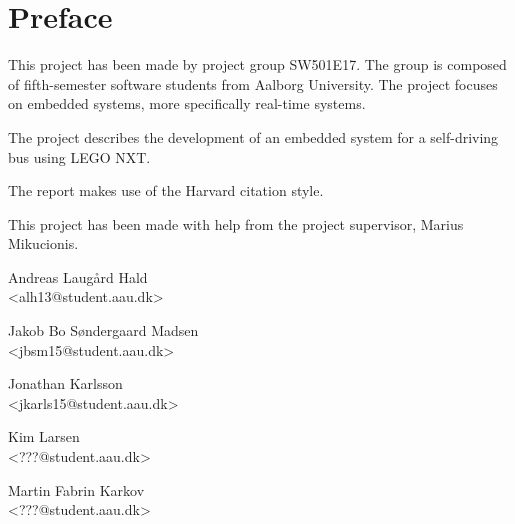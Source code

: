 \chapter*{Preface}

This project has been made by project group SW501E17. The group is composed of fifth-semester software students from Aalborg University. The project focuses on embedded systems, more specifically real-time systems. 

The project describes the development of an embedded system for a self-driving bus using LEGO NXT.

The report makes use of the Harvard citation style.

This project has been made with help from the project supervisor, Marius Mikucionis.




\vspace{\baselineskip}\hfill
\vfill\noindent
\vspace{3\baselineskip}
\begin{minipage}[b]{0.45\textwidth}
 \centering
  Andreas Laugård Hald\\
 {\footnotesize <alh13@student.aau.dk>}
\end{minipage}
\hfill
\begin{minipage}[b]{0.45\textwidth}
 \centering
  Jakob Bo Søndergaard Madsen\\
 {\footnotesize <jbsm15@student.aau.dk>}
\end{minipage}
\vspace{3\baselineskip}
\begin{minipage}[b]{0.45\textwidth}
 \centering
  Jonathan Karlsson\\
 {\footnotesize <jkarls15@student.aau.dk>}
\end{minipage}
\hfill
\begin{minipage}[b]{0.45\textwidth}
 \centering
  Kim Larsen\\
 {\footnotesize <???@student.aau.dk>}
\end{minipage}
\vspace{3\baselineskip}
\begin{minipage}[b]{\textwidth}
 \centering
  Martin Fabrin Karkov\\
 {\footnotesize <???@student.aau.dk>}
\end{minipage}

